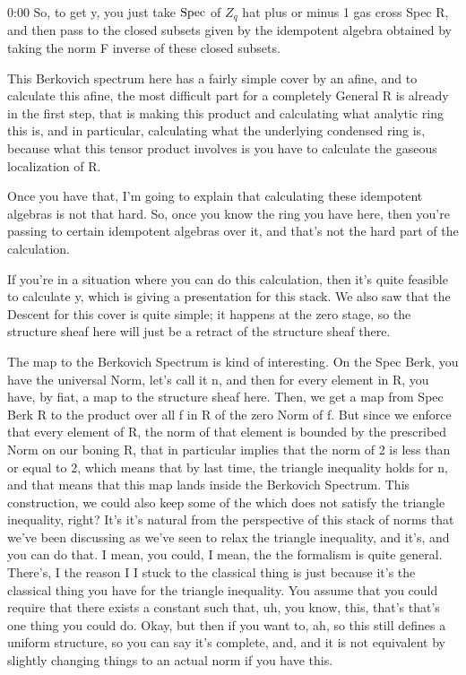 \begin{unfinished}{0:00}
So, to get y, you just take $\operatorname{Spec}$ of $Z_q$ hat plus or minus 1 gas cross Spec R, and then pass to the closed subsets given by the idempotent algebra obtained by taking the norm F inverse of these closed subsets.

This Berkovich spectrum here has a fairly simple cover by an afine, and to calculate this afine, the most difficult part for a completely General R is already in the first step, that is making this product and calculating what analytic ring this is, and in particular, calculating what the underlying condensed ring is, because what this tensor product involves is you have to calculate the gaseous localization of R.

Once you have that, I'm going to explain that calculating these idempotent algebras is not that hard. So, once you know the ring you have here, then you're passing to certain idempotent algebras over it, and that's not the hard part of the calculation.

If you're in a situation where you can do this calculation, then it's quite feasible to calculate y, which is giving a presentation for this stack. We also saw that the Descent for this cover is quite simple; it happens at the zero stage, so the structure sheaf here will just be a retract of the structure sheaf there.

The map to the Berkovich Spectrum is kind of interesting. On the Spec Berk, you have the universal Norm, let's call it n, and then for every element in R, you have, by fiat, a map to the structure sheaf here. Then, we get a map from Spec Berk R to the product over all f in R of the zero Norm of f. But since we enforce that every element of R, the norm of that element is bounded by the prescribed Norm on our boning R, that in particular implies that the norm of 2 is less than or equal to 2, which means that by last time, the triangle inequality holds for n, and that means that this map lands inside the Berkovich Spectrum.
This construction, we could also keep some of the which does not satisfy the triangle inequality, right? It's it's natural from the perspective of this stack of norms that we've been discussing as we've seen to relax the triangle inequality, and it's, and you can do that. I mean, you could, I mean, the the formalism is quite general. There's, I the reason I I stuck to the classical thing is just because it's the classical thing you have for the triangle inequality. You assume that you could require that there exists a constant such that, uh, you know, this, that's that's one thing you could do. Okay, but then if you want to, ah, so this still defines a uniform structure, so you can say it's complete, and, and it is not equivalent by slightly changing things to an actual norm if you have this. 


\end{unfinished}
